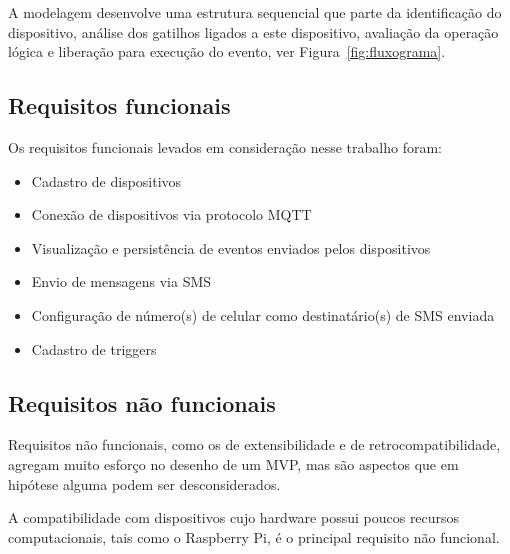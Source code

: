 A modelagem desenvolve uma estrutura sequencial que parte da identificação do dispositivo, análise dos gatilhos ligados a este dispositivo, avaliação da operação lógica e liberação para execução do evento, ver Figura~\ref{fig:fluxograma}.  

\subsection{Requisitos funcionais}
\label{reqFuncionais}

Os requisitos funcionais levados em consideração nesse trabalho foram:

\begin{itemize}
	\item Cadastro de dispositivos
	\item Conexão de dispositivos via protocolo MQTT
	\item Visualização e persistência de eventos enviados pelos dispositivos
	\item Envio de mensagens via SMS
	\item Configuração de número(s) de celular como destinatário(s) de SMS enviada
	\item Cadastro de triggers
\end{itemize}

\subsection{Requisitos não funcionais}
\label{reqNaoFuncionais}

Requisitos não funcionais, como os de extensibilidade e de retrocompatibilidade, agregam muito esforço no desenho de um MVP, mas são aspectos que em hipótese alguma podem ser desconsiderados.

A compatibilidade com dispositivos cujo hardware possui poucos recursos computacionais, tais como o Raspberry Pi, é o principal requisito não funcional.